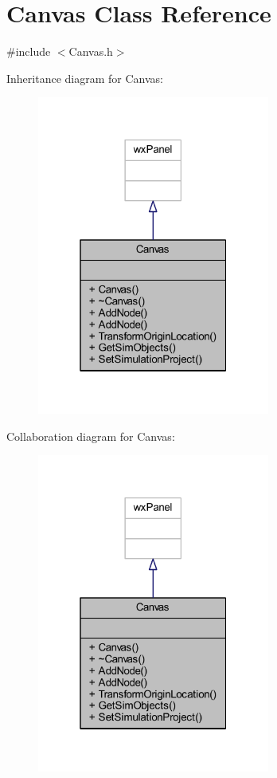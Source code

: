 \hypertarget{class_canvas}{}\section{Canvas Class Reference}
\label{class_canvas}


{\ttfamily \#include $<$Canvas.\+h$>$}



Inheritance diagram for Canvas\+:
\nopagebreak
\begin{figure}[H]
\begin{center}
\leavevmode
\includegraphics[width=217pt]{class_canvas__inherit__graph}
\end{center}
\end{figure}


Collaboration diagram for Canvas\+:
\nopagebreak
\begin{figure}[H]
\begin{center}
\leavevmode
\includegraphics[width=217pt]{class_canvas__coll__graph}
\end{center}
\end{figure}
